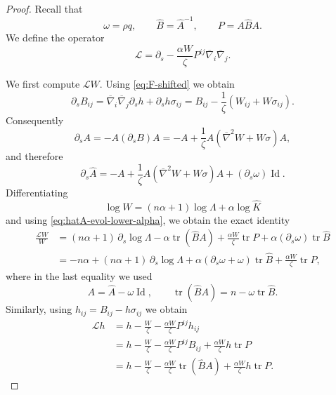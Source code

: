 \documentclass[11pt, reqno]{amsart}
\theoremstyle{remark}
\theoremstyle{definition}
\numberwithin{equation}{section}
\DeclareMathOperator{\tr}{tr}
\newcommand{\Id}{\operatorname{Id}}
\begin{document}
\begin{proof}
Recall that
\begin{equation*}
    \omega=\rho q,
    \qquad
    \widehat B=\widehat A^{-1},
    \qquad
    P=A\widehat B A.
\end{equation*}
We define the operator
\begin{equation*}
        \mathcal L
        =\partial_s-\frac{\alpha W}{\zeta}P^{ij}\overline{\nabla}_i\overline{\nabla}_j.
\end{equation*}

We first compute $\mathcal{L}W$. Using \eqref{eq:F-shifted} we obtain
\begin{equation*}
        \partial_sB_{ij}
        =\overline{\nabla}_i\overline{\nabla}_j \partial_sh+\partial_sh\sigma_{ij}
        =B_{ij}-\frac{1}{\zeta}(W_{ij}+W\sigma_{ij}).
\end{equation*}
Consequently
\begin{equation*}
        \partial_sA=-A(\partial_sB)A
        =-A+\frac{1}{\zeta} A(\overline{\nabla}^2 W+ W\sigma)A,
\end{equation*}
and therefore
\begin{equation}\label{eq:hatA-evol-lower-alpha}
        \partial_s\widehat A
        =-A+\frac{1}{\zeta} A(\overline{\nabla}^2 W+ W\sigma)A+(\partial_s\omega)\Id .
\end{equation}
Differentiating
\begin{equation*}
        \log W=(n\alpha+1)\log \Lambda+\alpha\log\widehat K
\end{equation*}
and using \eqref{eq:hatA-evol-lower-alpha}, we obtain the exact identity
\begin{align}
        \frac{\mathcal L W}{W}
        &=
        (n\alpha+1)\,\partial_s\log \Lambda
        -\alpha\tr(\widehat B A)
        +\frac{\alpha W}{\zeta}\tr P
        +\alpha(\partial_s\omega)\tr\widehat B   \nonumber \\
        &=
        -n\alpha
        +(n\alpha+1)\,\partial_s\log \Lambda
        +\alpha(\partial_s\omega+\omega)\tr\widehat B
        +\frac{\alpha W}{\zeta}\tr P,   \label{eq:LF-rough}
\end{align}
where in the last equality we used
\begin{equation*}
        A=\widehat A-\omega\Id,\qquad
        \tr(\widehat B A)=n-\omega\tr\widehat B .
\end{equation*}
Similarly, using $h_{ij}=B_{ij}-h\sigma_{ij}$ we obtain
\begin{align}
        \mathcal{L} h
        &=h-\frac{W}{\zeta}
          -\frac{\alpha W}{\zeta}P^{ij}h_{ij} \nonumber  \\
        &=h-\frac{W}{\zeta}
          -\frac{\alpha W}{\zeta}P^{ij}B_{ij}
          +\frac{\alpha W}{\zeta}h\tr P     \nonumber     \\
        &=h-\frac{W}{\zeta}
          -\frac{\alpha W}{\zeta}\tr(\widehat B A)
          +\frac{\alpha W}{\zeta}h\tr P.  \label{eq:Lh-exact-lower-alpha}
\end{align}


\end{proof}
\end{document}
